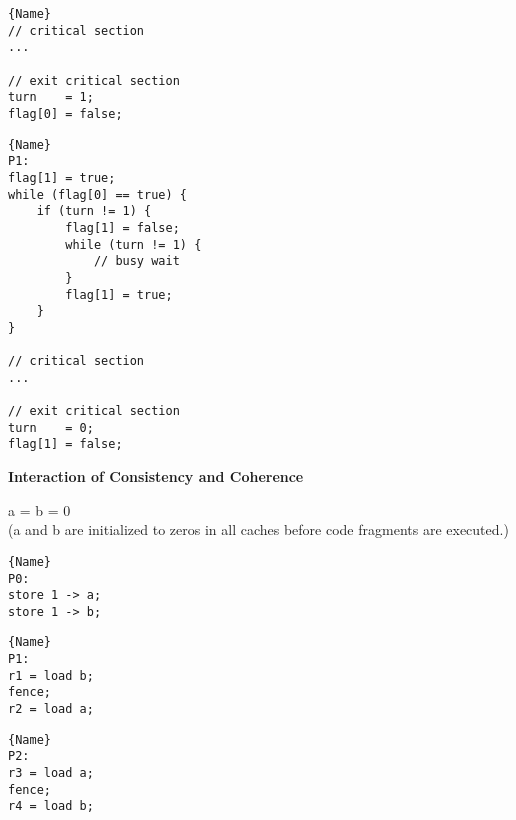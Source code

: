 \documentclass[12pt]{exam}
\begin{document}
\begin{questions}
\begin{minipage}{.45\textwidth}
\begin{lstlisting}[frame=tlrb]{Name}
// critical section
...

// exit critical section
turn    = 1;
flag[0] = false;
        \end{lstlisting}
    \end{minipage}\hfill
    \begin{minipage}{.45\textwidth}
        \begin{lstlisting}[frame=tlrb]{Name}
P1:
flag[1] = true;
while (flag[0] == true) {
    if (turn != 1) {
        flag[1] = false;
        while (turn != 1) {
            // busy wait
        }
        flag[1] = true;
    }
}

// critical section
...

// exit critical section
turn    = 0;
flag[1] = false;
        \end{lstlisting}
    \end{minipage}

    \newpage

    \question[10]\textbf{Interaction of Consistency and Coherence}

\begin{center}
    a = b = 0\\
    (a and b are initialized to zeros in all caches before code fragments
    are executed.)
\end{center}

    \noindent\begin{minipage}{.25\textwidth}
        \begin{lstlisting}[frame=tlrb]{Name}
P0:
store 1 -> a;
store 1 -> b;
        \end{lstlisting}
    \end{minipage}\hfill
    \begin{minipage}{.25\textwidth}
        \begin{lstlisting}[frame=tlrb]{Name}
P1:
r1 = load b;
fence;
r2 = load a;
        \end{lstlisting}
    \end{minipage}\hfill
    \begin{minipage}{.25\textwidth}
        \begin{lstlisting}[frame=tlrb]{Name}
P2:
r3 = load a;
fence;
r4 = load b;
        \end{lstlisting}
    \end{minipage}


\end{questions}
\end{document}
